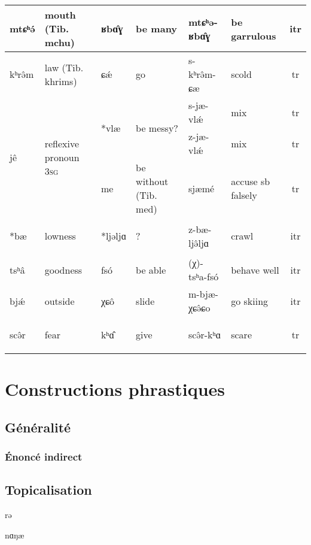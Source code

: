 \documentclass[11pt, a4paper]{book}              %
\newcommand{\ipa}[1]{{\phon \mbox{#1}}} %
\begin{document}
\begin{table}[H]
{\begin{tabular}{ ll|ll|ll|c }
   \ipa{mtɕʰə́} & mouth (Tib. \ipa{mchu}) & \ipa{ʁbɑ̂ɣ} & be many & \ipa{mtɕʰə-ʁbɑ̂ɣ} & be garrulous & itr \\ \hline
   \ipa{kʰrə̂m} & law (Tib. \ipa{khrims}) & \ipa{ɕǽ} & go & \ipa{s-kʰrə̂m-ɕæ} & scold & tr \\ \hline
   \multirow{3}{*}{\ipa{jê}} & \multirow{3}{*}{reflexive pronoun \textsc{3sg}} & \multirow{2}{*}{\hypertarget{vla}{\ipa{*vlæ}}}  & \multirow{2}{*}{be messy?} & \ipa{s-jæ-vlǽ} & mix  & tr\\ \cline{5-7}
   & & & & \ipa{z-jæ-vlǽ} & mix & tr\\ \cline{3-7}
   & & \ipa{me} & be without (Tib. \ipa{med}) & \ipa{sjæmé} & accuse sb falsely & tr \\ \hline
   \hypertarget{ba}{\ipa{*bæ}} &  lowness & \hypertarget{lje}{\ipa{*ljəljɑ}} & ? & \ipa{z-bæ-ljə̂ljɑ} & crawl & itr \\ \hline
    \ipa{tsʰâ} &  goodness & \ipa{fsó} & be able & \ipa{(χ)-tsʰa-fsó} & behave well & itr \\ \hline
    \ipa{bjǽ} &  outside & \ipa{χɕô} & slide & \ipa{m-bjæ-χɕə̂ɕo} & go skiing & itr \\ \hline
    \hypertarget{scer}{\ipa{scə̂r}} & fear & \ipa{kʰɑ̂} & give &  \ipa{scə̂r-kʰɑ} & scare & tr \\ \hline
  \end{tabular}
  }
\end{table}	


\part{Constructions phrastiques}


\chapter{Généralité}
\section{Énoncé indirect}


\chapter{Topicalisation}

\ipa{rə}

\ipa{nɑŋæ}
\end{document}

